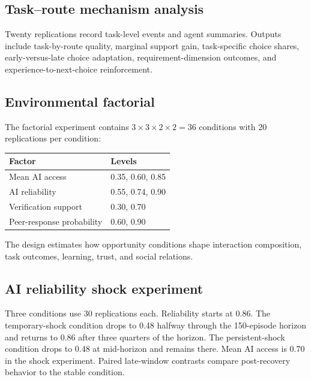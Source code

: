 \documentclass[11pt]{article}
\begin{document}
\subsection{Task--route mechanism analysis}
Twenty replications record task-level events and agent summaries. Outputs include task-by-route quality, marginal support gain, task-specific choice shares, early-versus-late choice adaptation, requirement-dimension outcomes, and experience-to-next-choice reinforcement.

\subsection{Environmental factorial}
The factorial experiment contains $3\times3\times2\times2=36$ conditions with 20 replications per condition:
\begin{center}
\begin{tabular}{ll}
\toprule Factor & Levels \\
\midrule
Mean AI access & 0.35, 0.60, 0.85 \\
AI reliability & 0.55, 0.74, 0.90 \\
Verification support & 0.30, 0.70 \\
Peer-response probability & 0.60, 0.90 \\
\bottomrule
\end{tabular}
\end{center}
The design estimates how opportunity conditions shape interaction composition, task outcomes, learning, trust, and social relations.

\subsection{AI reliability shock experiment}
Three conditions use 30 replications each. Reliability starts at 0.86. The temporary-shock condition drops to 0.48 halfway through the 150-episode horizon and returns to 0.86 after three quarters of the horizon. The persistent-shock condition drops to 0.48 at mid-horizon and remains there. Mean AI access is 0.70 in the shock experiment. Paired late-window contrasts compare post-recovery behavior to the stable condition.
\end{document}
